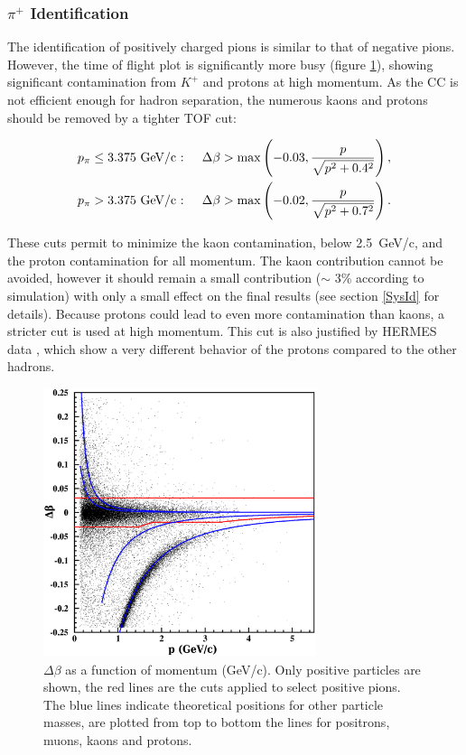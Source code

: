\subsubsection{$\pi^+$ Identification}

The identification of positively charged pions is similar to that of negative 
pions. However, the time of flight plot is significantly more busy (figure 
\ref{PipTOF}), showing significant contamination from $K^+$ and protons at 
high momentum. As the CC is not efficient enough for hadron separation, the 
numerous kaons and protons should be removed by a tighter TOF cut:

\begin{subequations}\label{TOF-Pip}
\begin{align}
    p_\pi &\leq 3.375 \text{ GeV/c : }
  & \Delta \beta &> \max\left(-0.03,{p \over\sqrt{p^2+0.4^2}}\right), \\ 
    p_\pi &> 3.375    \text{ GeV/c : }
  & \Delta \beta &> \max\left(-0.02,{p \over\sqrt{p^2+0.7^2}}\right).
\end{align}
\end{subequations}

These cuts permit to minimize the kaon contamination, below 2.5~GeV/c, and the 
proton contamination for all momentum. The kaon contribution cannot be avoided, however 
it should remain a small contribution ($\sim$ 3\% according to simulation) 
with only a small effect on the final results (see section \ref{SysId} 
for details). Because protons could lead to even more contamination than kaons, 
a stricter cut is used at high momentum. This cut is also justified by 
HERMES data \cite{Airapetian:2007vu}, which show a very 
different behavior of the protons compared to the other hadrons.

\begin{figure}[tbp]
\centering
\includegraphics[width=8cm] {chap5-fig/pip_data.png} 
\caption {$\Delta \beta$ as a 
function of momentum (GeV/c). Only positive particles are shown, the red 
lines are the cuts applied to select positive pions. The blue lines indicate 
theoretical positions for other particle masses, are plotted from top to 
bottom the lines for positrons, muons, kaons and protons.}
\label{PipTOF}
\end{figure}

